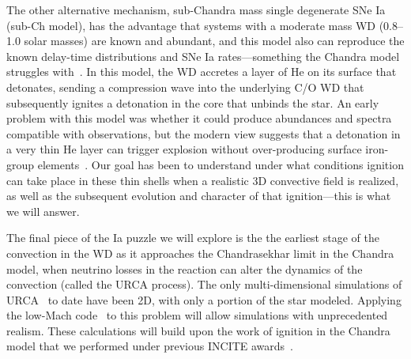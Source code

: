 The other alternative mechanism, sub-Chandra mass single degenerate
SNe Ia (sub-Ch model), 
has the advantage that systems with a moderate mass WD
(0.8--1.0 solar masses) are known and abundant, and this model also
can reproduce the known delay-time distributions and SNe Ia
rates---something the Chandra model struggles with~\cite{ruiter:2011}.
In this model, the WD accretes a layer of He on its surface
that detonates, sending a compression wave into the underlying C/O WD
that subsequently ignites a detonation in the core that unbinds the
star.  An early problem with this model was whether it 
could produce abundances and spectra compatible with observations, 
but the modern view suggests that a detonation in a very thin He layer
can trigger explosion without over-producing surface iron-group
elements~\cite{fink:2010}.  Our goal has been to understand under what
conditions ignition can take place in these thin shells when a
realistic 3D convective field is realized, as well as the subsequent
evolution and character of that ignition---this is what we will
answer.

The final piece of the Ia puzzle we will explore is the the earliest
stage of the convection in the WD as it approaches the Chandrasekhar
limit in the Chandra model, when neutrino losses in the reaction can
alter the dynamics of the convection (called the URCA process).  The
only multi-dimensional simulations of URCA~\cite{URCA} to date have
been 2D, with only a portion of the star modeled.  Applying the
low-Mach code \maestro\ to this problem will allow simulations with
unprecedented realism.  These calculations will build upon the 
work of ignition in the Chandra model that we performed under
previous INCITE awards~\cite{Non12}.
